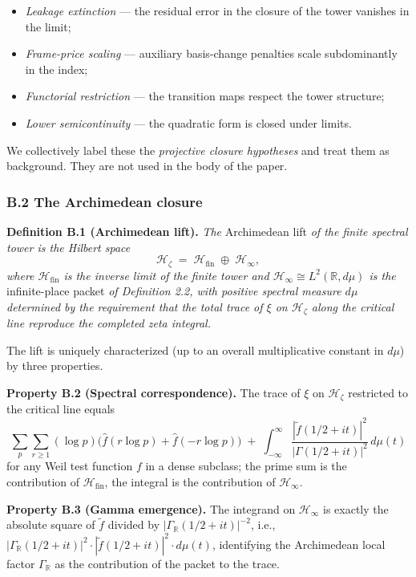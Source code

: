 \documentclass[
  letterpaper,
  11pt]{article}
\providecommand{\tightlist}{%
  \setlength{\itemsep}{0pt}\setlength{\parskip}{0pt}}
\theoremstyle{plain}
\theoremstyle{definition}
\theoremstyle{remark}
\begin{document}
\begin{itemize}
\tightlist
\item
  \emph{Leakage extinction} --- the residual error in the closure of the tower vanishes in the limit;
\item
  \emph{Frame-price scaling} --- auxiliary basis-change penalties scale subdominantly in the index;
\item
  \emph{Functorial restriction} --- the transition maps respect the tower structure;
\item
  \emph{Lower semicontinuity} --- the quadratic form is closed under limits.
\end{itemize}

We collectively label these the \emph{projective closure hypotheses} and treat them as background. They are not used in the body of the paper.

\subsubsection{B.2 The Archimedean closure}\label{b.2-the-archimedean-closure}

\textbf{Definition B.1 (Archimedean lift).} \emph{The} Archimedean lift \emph{of the finite spectral tower is the Hilbert space}
\[\mathcal{H}_\zeta \;=\; \mathcal{H}_\text{fin} \;\oplus\; \mathcal{H}_\infty,\]
\emph{where \(\mathcal{H}_\text{fin}\) is the inverse limit of the finite tower and \(\mathcal{H}_\infty \cong L^2(\mathbb{R}, d\mu)\) is the} infinite-place packet \emph{of Definition 2.2, with positive spectral measure \(d\mu\) determined by the requirement that the total trace of \(\xi\) on \(\mathcal{H}_\zeta\) along the critical line reproduce the completed zeta integral.}

The lift is uniquely characterized (up to an overall multiplicative constant in \(d\mu\)) by three properties.

\textbf{Property B.2 (Spectral correspondence).} The trace of \(\xi\) on \(\mathcal{H}_\zeta\) restricted to the critical line equals
\[\sum_p \sum_{r \geq 1} (\log p)\bigl(\hat f(r\log p) + \hat f(-r\log p)\bigr) \;+\; \int_{-\infty}^\infty \frac{|\tilde f(1/2 + it)|^2}{|\Gamma(1/2 + it)|^2}\,d\mu(t)\]
for any Weil test function \(f\) in a dense subclass; the prime sum is the contribution of \(\mathcal{H}_\text{fin}\), the integral is the contribution of \(\mathcal{H}_\infty\).

\textbf{Property B.3 (Gamma emergence).} The integrand on \(\mathcal{H}_\infty\) is exactly the absolute square of \(\tilde f\) divided by \(|\Gamma_{\mathbb{R}}(1/2 + it)|^{-2}\), i.e., \(|\Gamma_{\mathbb{R}}(1/2 + it)|^2 \cdot |\tilde f(1/2 + it)|^2 \cdot d\mu(t)\), identifying the Archimedean local factor \(\Gamma_{\mathbb{R}}\) as the contribution of the packet to the trace.
\end{document}
